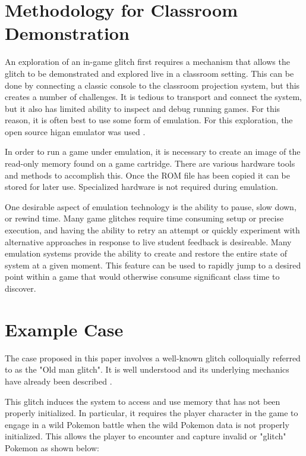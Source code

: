 \documentclass[letterpaper]{article}
\begin{document}
\section{Methodology for Classroom Demonstration}

An exploration of an in-game glitch first requires a mechanism that allows the glitch to be demonstrated and explored live in a classroom setting. This can be done by connecting a classic console to the classroom projection system, but this creates a number of challenges. It is tedious to transport and connect the system, but it also has limited ability to inspect and debug running games. For this reason, it is often best to use some form of emulation. For this exploration, the open source higan emulator was used \cite{ginder2004higan}.

In order to run a game under emulation, it is necessary to create an image of the read-only memory found on a game cartridge. There are various hardware tools and methods to accomplish this. Once the ROM file has been copied it can be stored for later use. Specialized hardware is not required during emulation.

One desirable aspect of emulation technology is the ability to pause, slow down, or rewind time. Many game glitches require time consuming setup or precise execution, and having the ability to retry an attempt or quickly experiment with alternative approaches in response to live student feedback is desireable. Many emulation systems provide the ability to create and restore the entire state of system at a given moment. This feature can be used to rapidly jump to a desired point within a game that would otherwise consume significant class time to discover.

\section{Example Case}
The case proposed in this paper involves a well-known glitch colloquially referred to as the "Old man glitch". It is well understood and its underlying mechanics have already been described \cite{bulbapedia2005} \cite{scrumpy2016missing}.

This glitch induces the system to access and use memory that has not been properly initialized. In particular, it requires the player character in the game to engage in a wild Pokemon battle when the wild Pokemon data is not properly initialized. This allows the player to encounter and capture invalid or "glitch" Pokemon as shown below:
\end{document}
